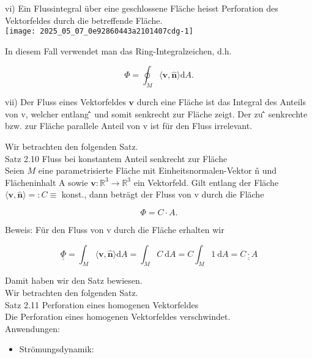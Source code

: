 \documentclass[10pt]{article}
\begin{document}
vi) Ein Flussintegral über eine geschlossene Fläche heisst Perforation des Vektorfeldes durch die betreffende Fläche.\\
\texttt{[image: 2025\_05\_07\_0e92860443a2101407cdg-1]}

In diesem Fall verwendet man das Ring-Integralzeichen, d.h.


\begin{equation*}
\Phi=\oint_{M}\langle\mathbf{v}, \hat{\mathbf{n}}\rangle \mathrm{d} A . \tag{2.125}
\end{equation*}


vii) Der Fluss eines Vektorfeldes $\mathbf{v}$ durch eine Fläche ist das Integral des Anteils von v, welcher entlang ̂̂ und somit senkrecht zur Fläche zeigt. Der zu ̂̂ senkrechte bzw. zur Fläche parallele Anteil von v ist für den Fluss irrelevant.

Wir betrachten den folgenden Satz.\\
Satz 2.10 Fluss bei konstantem Anteil senkrecht zur Fläche\\
Seien $M$ eine parametrisierte Fläche mit Einheitsnormalen-Vektor n̂ und Flächeninhalt A sowie $\mathbf{v}: \mathbb{R}^{3} \rightarrow \mathbb{R}^{3}$ ein Vektorfeld. Gilt entlang der Fläche $\langle\mathbf{v}, \hat{\mathbf{n}}\rangle=: C \equiv$ konst., dann beträgt der Fluss von v durch die Fläche


\begin{equation*}
\Phi=C \cdot A . \tag{2.126}
\end{equation*}


Beweis: Für den Fluss von v durch die Fläche erhalten wir


\begin{equation*}
\underline{\underline{\Phi}}=\int_{M}\langle\mathbf{v}, \hat{\mathbf{n}}\rangle \mathrm{d} A=\int_{M} C \mathrm{~d} A=C \int_{M} 1 \mathrm{~d} A=\underline{\underline{C \cdot A}} \tag{2.127}
\end{equation*}


Damit haben wir den Satz bewiesen.\\
Wir betrachten den folgenden Satz.\\
Satz 2.11 Perforation eines homogenen Vektorfeldes\\
Die Perforation eines homogenen Vektorfeldes verschwindet.\\
Anwendungen:

\begin{itemize}
  \item Strömungsdynamik:
\end{itemize}
\end{document}
